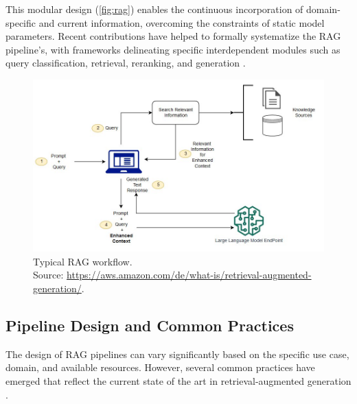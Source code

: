 \begin{spacing}{1.5}
This modular design (\autoref{fig:rag}) enables the continuous incorporation of domain-specific and current information, overcoming the constraints of static model parameters. Recent contributions have helped to formally systematize the RAG pipeline's, with frameworks delineating specific interdependent modules such as query classification, retrieval, reranking, and generation \parencite{wang_searching_2024,gao_retrieval-augmented_2024}.

\begin{figure}[H]
  \centering
  \includegraphics[width=\textwidth]{images/rag_workflow.jpg} 
  \caption{Typical RAG workflow.\\
  \footnotesize{Source: \url{https://aws.amazon.com/de/what-is/retrieval-augmented-generation/}.\nocite{noauthor_was_nodate}}}
  \label{fig:rag}
\end{figure}

\subsection{Pipeline Design and Common Practices}
The design of RAG pipelines can vary significantly based on the specific use case, domain, and available resources. However, several common practices have emerged that reflect the current state of the art in retrieval-augmented generation \citep{vaibhav_retrieval-augmented_2025,wang_searching_2024,arslan_survey_2024,gao_retrieval-augmented_2024,gupta_comprehensive_2024}.


\end{spacing}
